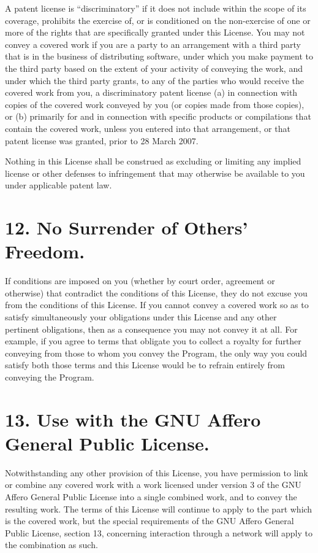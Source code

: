 \documentclass[11pt,a4paper]{article}
\begin{document}
A patent license is “discriminatory” if it does not include within the
scope of its coverage, prohibits the exercise of, or is conditioned on
the non-exercise of one or more of the rights that are specifically
granted under this License. You may not convey a covered work if you are
a party to an arrangement with a third party that is in the business of
distributing software, under which you make payment to the third party
based on the extent of your activity of conveying the work, and under
which the third party grants, to any of the parties who would receive
the covered work from you, a discriminatory patent license (a) in
connection with copies of the covered work conveyed by you (or copies
made from those copies), or (b) primarily for and in connection with
specific products or compilations that contain the covered work, unless
you entered into that arrangement, or that patent license was granted,
prior to 28 March 2007.

Nothing in this License shall be construed as excluding or limiting any
implied license or other defenses to infringement that may otherwise be
available to you under applicable patent law.

\part*{12. No Surrender of Others' Freedom.}

If conditions are imposed on you (whether by court order, agreement or
otherwise) that contradict the conditions of this License, they do not
excuse you from the conditions of this License. If you cannot convey a
covered work so as to satisfy simultaneously your obligations under this
License and any other pertinent obligations, then as a consequence you
may not convey it at all. For example, if you agree to terms that
obligate you to collect a royalty for further conveying from those to
whom you convey the Program, the only way you could satisfy both those
terms and this License would be to refrain entirely from conveying the
Program.

\part*{13. Use with the GNU Affero General Public License.}

Notwithstanding any other provision of this License, you have permission
to link or combine any covered work with a work licensed under version 3
of the GNU Affero General Public License into a single combined work,
and to convey the resulting work. The terms of this License will
continue to apply to the part which is the covered work, but the special
requirements of the GNU Affero General Public License, section 13,
concerning interaction through a network will apply to the combination
as such.
\end{document}

